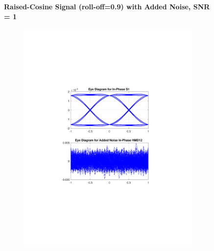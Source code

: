 \begin{figure}[H]
		\centering
	\textbf{Raised-Cosine Signal (roll-off=0.9) with Added Noise, SNR = 1}
	\begin{minipage}{\linewidth}
		\centering
	\begin{subfigure}{.45\textwidth}
		\centering
		\includegraphics[clip, trim=5cm 7cm 5cm 7cm, width=\textwidth]{./sdf/m_qam_system/figures/eyes/if_n_nmf_60_60_rc_09.pdf}
	\end{subfigure}
	\begin{subfigure}{.45\textwidth}
		\centering

\end{subfigure}
\end{minipage}
\end{figure}
